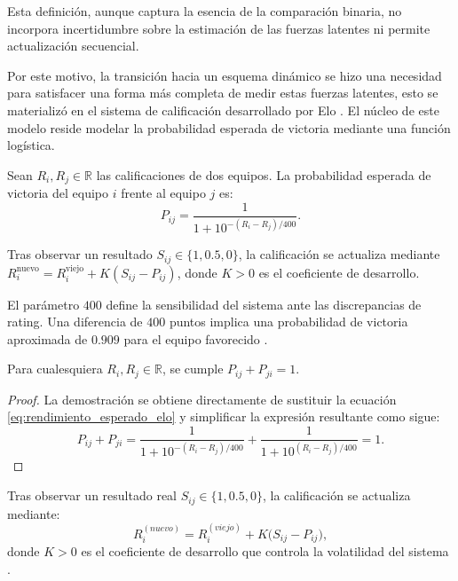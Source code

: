 Esta definici\'on, aunque captura la esencia de la comparaci\'on binaria, no incorpora incertidumbre sobre la estimaci\'on de las fuerzas latentes ni permite actualizaci\'on secuencial.

Por este motivo, la transici\'on hacia un esquema din\'amico se hizo una necesidad para satisfacer una forma m\'as completa de medir estas fuerzas latentes, esto se materializ\'o en el sistema de calificaci\'on desarrollado por Elo \cite{Elo1978}. El n\'ucleo de este modelo reside modelar la probabilidad esperada de victoria mediante una funci\'on log\'istica.

\begin{definition}\label{eq:rendimiento_esperado_elo}
	Sean $R_i, R_j \in \mathbb{R}$ las calificaciones de dos equipos. La probabilidad esperada de victoria del equipo $i$ frente al equipo $j$ es:
	\begin{equation}
		P_{ij} = \frac{1}{1 + 10^{-(R_i - R_j)/400}}.
	\end{equation}
\end{definition}

Tras observar un resultado $S_{ij} \in \{1, 0{.}5, 0\}$, la calificaci\'on se actualiza mediante $R_i^{\text{nuevo}} = R_i^{\text{viejo}} + K(S_{ij} - P_{ij})$, donde $K > 0$ es el coeficiente de desarrollo.

El par\'ametro $400$ define la sensibilidad del sistema ante las discrepancias de rating. Una diferencia de $400$ puntos implica una probabilidad de victoria aproximada de $0{.}909$ para el equipo favorecido \cite{EloModelConvergenceFinal}.

\begin{prop}
	Para cualesquiera $R_i, R_j \in \mathbb{R}$, se cumple $P_{ij} + P_{ji} = 1$.
\end{prop}
\begin{proof}
	La demostraci\'on se obtiene directamente de sustituir la ecuaci\'on \eqref{eq:rendimiento_esperado_elo} y simplificar la expresi\'on resultante como sigue:
	\begin{equation}
		P_{ij} + P_{ji} = \frac{1}{1 + 10^{-(R_i-R_j)/400}} + \frac{1}{1 + 10^{(R_i-R_j)/400}} = 1.
	\end{equation}
	
\end{proof}

\begin{definition}
	Tras observar un resultado real $S_{ij} \in \{1, 0{.}5, 0\}$, la calificaci\'on se actualiza mediante:
	\begin{equation}
		R_i^{(nuevo)} = R_i^{(viejo)} + K\bigl(S_{ij} - P_{ij}\bigr),
	\end{equation}
	donde $K > 0$ es el coeficiente de desarrollo que controla la volatilidad del sistema \cite{EloModelConvergenceFinal}.
\end{definition}

